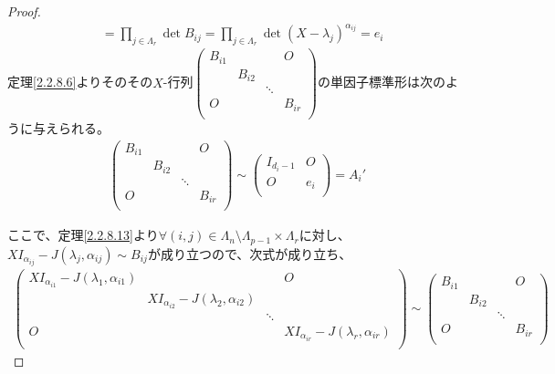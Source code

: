 \documentclass[dvipdfmx]{jsarticle}
\begin{document}
\begin{proof}
\begin{align*}
&= \prod_{j \in \varLambda_{r}} {\det{B_{ij}}} = \prod_{j \in \varLambda_{r}} {\det\left( X - \lambda_{j} \right)^{\alpha_{ij}}} = e_{i}
\end{align*}
定理\ref{2.2.8.6}よりそのその$X$-行列$\begin{pmatrix}
B_{i1} & \  & \  & O \\
\  & B_{i2} & \  & \  \\
\  & \  & \ddots & \  \\
O & \  & \  & B_{ir} \\
\end{pmatrix}$の単因子標準形は次のように与えられる。
\begin{align*}
\begin{pmatrix}
B_{i1} & \  & \  & O \\
\  & B_{i2} & \  & \  \\
\  & \  & \ddots & \  \\
O & \  & \  & B_{ir} \\
\end{pmatrix} \sim \begin{pmatrix}
I_{d_{i} - 1} & O \\
O & e_{i} \\
\end{pmatrix} = A_{i}'
\end{align*}\par
ここで、定理\ref{2.2.8.13}より$\forall(i,j) \in \varLambda_{n} \setminus \varLambda_{p - 1} \times \varLambda_{r}$に対し、$XI_{\alpha_{ij}} - J\left( \lambda_{j},\alpha_{ij} \right) \sim B_{ij}$が成り立つので、次式が成り立ち、
\begin{align*}
\begin{pmatrix}
XI_{\alpha_{i1}} - J\left( \lambda_{1},\alpha_{i1} \right) & \  & \  & O \\
\  & XI_{\alpha_{i2}} - J\left( \lambda_{2},\alpha_{i2} \right) & \  & \  \\
\  & \  & \ddots & \  \\
O & \  & \  & XI_{\alpha_{ir}} - J\left( \lambda_{r},\alpha_{ir} \right) \\
\end{pmatrix} \sim \begin{pmatrix}
B_{i1} & \  & \  & O \\
\  & B_{i2} & \  & \  \\
\  & \  & \ddots & \  \\
O & \  & \  & B_{ir} \\
\end{pmatrix}
\end{align*}

\end{proof}
\end{document}
